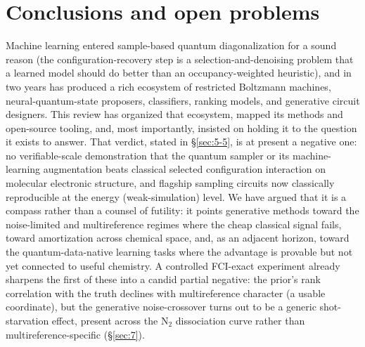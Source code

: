 \documentclass[11pt]{article}
\begin{document}
\section{Conclusions and open problems}\label{sec:8}

Machine learning entered sample-based quantum diagonalization for a sound reason (the configuration-recovery step is a selection-and-denoising problem that a learned model should do better than an occupancy-weighted heuristic), and in two years has produced a rich ecosystem of restricted Boltzmann machines, neural-quantum-state proposers, classifiers, ranking models, and generative circuit designers. This review has organized that ecosystem, mapped its methods and open-source tooling, and, most importantly, insisted on holding it to the question it exists to answer. That verdict, stated in \S\ref{sec:5-5}, is at present a negative one: no verifiable-scale demonstration that the quantum sampler or its machine-learning augmentation beats classical selected configuration interaction on molecular electronic structure, and flagship sampling circuits now classically reproducible at the energy (weak-simulation) level. We have argued that it is a compass rather than a counsel of futility: it points generative methods toward the noise-limited and multireference regimes where the cheap classical signal fails, toward amortization across chemical space, and, as an adjacent horizon, toward the quantum-data-native learning tasks where the advantage is provable but not yet connected to useful chemistry. A controlled FCI-exact experiment already sharpens the first of these into a candid partial negative: the prior's rank correlation with the truth declines with multireference character (a usable coordinate), but the generative noise-crossover turns out to be a generic shot-starvation effect, present across the N$_2$ dissociation curve rather than multireference-specific (\S\ref{sec:7}).
\end{document}
